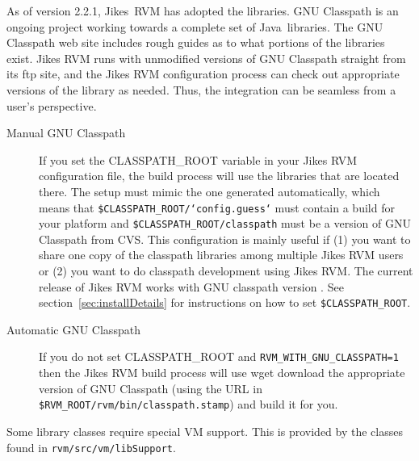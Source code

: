  As of version 2.2.1, Jikes\JikesTMFootnote\ RVM has adopted the
 libraries.  GNU
Classpath is an ongoing project working towards a complete set of
Java\JavaTMFootnote\ libraries.  The GNU Classpath web site includes
rough guides as to what portions of the libraries exist.  Jikes RVM
runs with unmodified versions of GNU Classpath straight from its ftp
site, and the Jikes RVM configuration process can check out
appropriate versions of the library as needed.  Thus, the integration
can be seamless from a user's perspective.

\begin{description}
\item[Manual GNU Classpath] If you set the CLASSPATH\_ROOT variable in
your Jikes RVM configuration file, the build process will use the
libraries that are located there.  The setup must mimic the one
generated automatically, which means that
{\tt \$CLASSPATH\_ROOT/`config.guess`} must contain a build for your platform
and {\tt \$CLASSPATH\_ROOT/classpath} must be a version of GNU Classpath from
CVS.  This configuration is mainly useful if (1) you want to share one
copy of the classpath libraries among multiple Jikes RVM users or (2)
you want to do classpath development using Jikes RVM. The
current release of Jikes RVM works with GNU classpath version
\classpathversion. See section~\ref{sec:installDetails} for instructions
on how to set {\tt \$CLASSPATH\_ROOT}.

\item[Automatic GNU Classpath] If you do not set CLASSPATH\_ROOT and 
{\tt RVM\_WITH\_GNU\_CLASSPATH=1} then the Jikes RVM build process
will use wget download the appropriate version of GNU Classpath (using
the URL in {\tt \$RVM\_ROOT/rvm/bin/classpath.stamp}) and build it for
you. 
\end{description}

Some library classes require special VM support.  This is provided by
the classes found in {\tt rvm/src/vm/libSupport}. 

\JavaTMFooter
\JikesTMFooter
